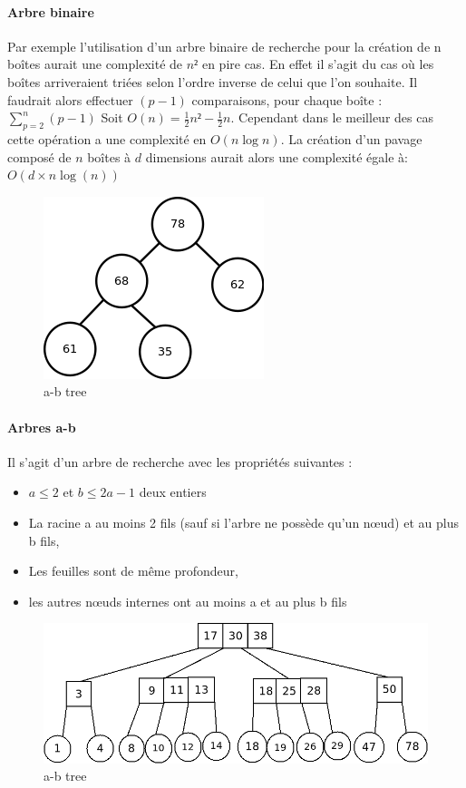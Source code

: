 \paragraph{Arbre binaire}
Par exemple l'utilisation d'un arbre binaire de recherche pour la création de n boîtes aurait une complexité de $n²$ en pire cas. En effet il s'agit du cas où les boîtes arriveraient triées selon l'ordre inverse de celui que l'on souhaite. Il faudrait alors effectuer $(p-1)$ comparaisons, pour chaque boîte :  $\sum_{p=2}^{n}(p-1)$  Soit $O(n)=\frac{1}{2}n²-\frac{1}{2}n$. Cependant dans le meilleur des cas cette opération a une complexité en $O(n\log{n})$. La création d'un pavage composé de $n$ boîtes à $d$ dimensions aurait alors une complexité égale à: $O(d \times n\log(n))$ 

\begin{figure}[htbp]
  \centering
  \includegraphics[scale=0.60]{img/binTree}
  \caption{a-b tree}
  \label{fig:dnuages}
\end{figure}

\clearpage
\paragraph{Arbres a-b}
Il s'agit d'un arbre de recherche avec les propriétés suivantes :
\begin{itemize}
\item
  $a\leq2$ et $b\leq 2a−1$ deux entiers
\item
  La racine a au moins 2 fils (sauf si l'arbre ne possède qu'un nœud) et au plus b fils,
\item 
  Les feuilles sont de même profondeur,
\item
  les autres nœuds internes ont au moins a et au plus b fils
\end{itemize}

\begin{figure}[htbp]
  \centering
  \includegraphics[scale=0.40]{img/abtree}
  \caption{a-b tree}
  \label{fig:dnuages}
\end{figure}


